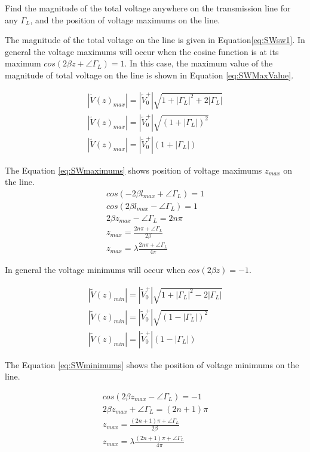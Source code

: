 \documentclass{ximera}
\begin{document}
\begin{example}

Find the magnitude of the total voltage anywhere on the transmission line for any $\Gamma_L$, and the position of voltage maximums on the line.
\begin{explanation}
 

The magnitude of the total voltage on the line is given in Equation\ref{eq:SWsw1}.  In general the voltage maximums will occur when the cosine function  is at its maximum
$cos(2 \beta z+\angle \Gamma_L)=1$. In this case, the maximum value of the magnitude of total voltage on the line is shown in Equation \ref{eq:SWMaxValue}.

\begin{eqnarray}
|\tilde{V}(z)_{max}|=|\tilde{V}_0^+|\sqrt{1+|\Gamma_L|^2+2 |\Gamma_L|} \nonumber  \\
|\tilde{V}(z)_{max}| =|\tilde{V}_0^+|\sqrt{(1+|\Gamma_L|)^2}  \nonumber \\
|\tilde{V}(z)_{max}| =|\tilde{V}_0^+|(1+|\Gamma_L|) \label{eq:SWMaxValue} 
\end{eqnarray}


The Equation \ref{eq:SWmaximums}  shows position of voltage maximums $z_{max}$ on the line. 
\begin{eqnarray}
cos(-2 \beta l_{max}+ \angle \Gamma_L)=1 \nonumber \\
cos(2 \beta l_{max}- \angle \Gamma_L)=1 \nonumber \\
2 \beta z_{max} - \angle \Gamma_L = 2 n \pi \nonumber \\
z_{max} =\frac{ 2 n \pi +\angle \Gamma_L }{ 2 \beta} \nonumber \\
z_{max}= \lambda \frac{ 2 n \pi +\angle \Gamma_L  }{ 4 \pi} \label{eq:SWmaximums}
\end{eqnarray}

In general the voltage minimums will occur when
$cos(2 \beta z)=-1$.
 

\begin{eqnarray}
|\tilde{V}(z)_{min}|=|\tilde{V}_0^+|\sqrt{1+|\Gamma_L|^2-2 |\Gamma_L|} \nonumber  \\
|\tilde{V}(z)_{min}| =|\tilde{V}_0^+|\sqrt{(1-|\Gamma_L|)^2}  \nonumber \\
|\tilde{V}(z)_{min}| =|\tilde{V}_0^+| (1-|\Gamma_L|) 
\end{eqnarray}

The Equation \ref{eq:SWminimums}  shows the position of voltage minimums on the line. 


\begin{eqnarray}
cos(2 \beta z_{max}-\angle \Gamma_L)=-1 \nonumber \\
2 \beta z_{max} + \angle \Gamma_L = (2 n+1) \pi \nonumber \\
z_{max} =\frac{ (2 n+1) \pi +\angle \Gamma_L }{ 2 \beta} \nonumber \\
z_{max}=\lambda \frac{ (2 n+1) \pi +\angle \Gamma_L  }{ 4 \pi} \label{eq:SWminimums}
\end{eqnarray}




\end{explanation}
\end{example}
\end{document}
